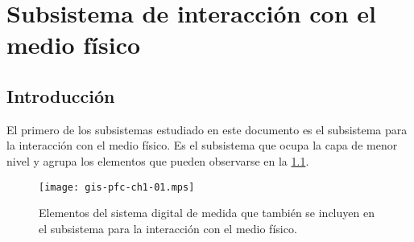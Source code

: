 \chapter{Subsistema de interacción con el medio físico}

\section{Introducción}

El primero de los subsistemas estudiado en este documento es el subsistema
para la interacción con el medio físico. Es el subsistema que ocupa la capa
de menor nivel y agrupa los elementos que pueden observarse en la
\cref{fig:submedium}.

\begin{figure}
	\begin{center}
		\texttt{[image: gis-pfc-ch1-01.mps]}
	\end{center}
	\caption[Subsistema para la interacción con el medio físico]
	{Elementos del sistema digital de medida que también se incluyen en
	el subsistema para la interacción con el medio físico.}
	\label{fig:submedium}
\end{figure}



